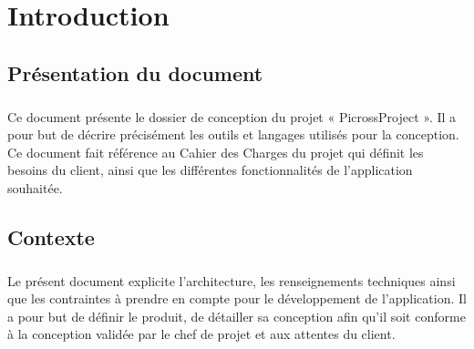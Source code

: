 
\newcommand{\titre}{{\Huge Dossier de conception}\\Groupe B}
\newcommand{\titrehead}{Dossier de conception}




\maketitle
\tableofcontents




\chapter{Introduction}


\section{Présentation du document}
        \paragraph*{}
        Ce document présente le dossier de conception du projet « PicrossProject ». Il a pour
	but de décrire précisément les outils et langages utilisés pour la conception.
	Ce document fait référence au Cahier des Charges du projet qui définit les
	besoins du client, ainsi que les différentes fonctionnalités de l’application souhaitée.

\section{Contexte}
        \paragraph*{}
        Le présent document explicite l’architecture, les renseignements techniques
	ainsi que les contraintes à prendre en compte pour le développement de
	l’application.
	Il a pour but de définir le produit, de détailler sa conception afin qu’il soit
	conforme à la conception validée par le chef de projet et aux attentes du client.
\newpage


